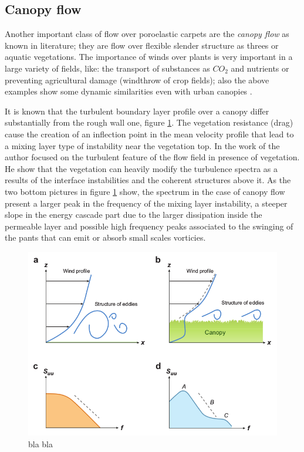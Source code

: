 \subsection{Canopy flow}

Another important class of flow over poroelastic carpets are the \textit{canopy flow} as known in literature; they are flow over flexible slender structure as threes or aquatic vegetations.
The importance of winds over plants is very important in a large variety of fields, like: the transport of substances as $CO_2$ and nutrients or preventing agricultural damage (windthrow of crop fields); also the above examples show some dynamic similarities even with urban canopies \citet{ghisalberti2009obstructed}.

It is known that the turbulent boundary layer profile over a canopy differ substantially from the rough wall one, figure \ref{fig:spectra}.
The vegetation resistance (drag) cause the creation of an inflection point in the mean velocity profile that lead to a mixing layer type of instability near the vegetation top.
In the work of \citet{finnigan2000turbulence} the author focused on the turbulent feature of the flow field in presence of vegetation.
He show that the vegetation can heavily modify the turbulence spectra as a results of the interface instabilities and the coherent structures above it.
As the two bottom pictures in figure \ref{fig:spectra} show, the spectrum in the case of canopy flow present a larger peak in the frequency of the mixing layer instability, a steeper slope in the energy cascade part due to the larger dissipation inside the permeable layer and possible high frequency peaks associated to the swinging of the pants that can emit or absorb small scales vorticies.
 
\begin{figure}[h]
	\centering
	\includegraphics[width=0.7\linewidth]{chapter_1/spectra}
	\caption{bla bla \citet{de2008effects}}
		\label{fig:spectra}
	\end{figure}


